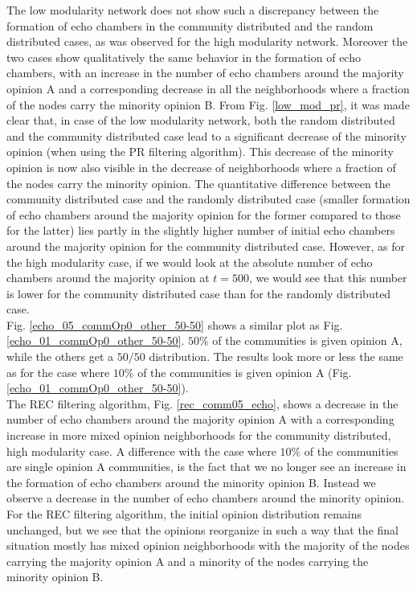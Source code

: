 \documentclass[11 pt , letterpaper , twoside , openright]{book}
\begin{document}
The low modularity network does not show such a discrepancy between the formation of echo chambers in the community distributed and the random distributed cases, as was observed for the high modularity network. Moreover the two cases show qualitatively the same behavior in the formation of echo chambers, with an increase in the number of echo chambers around the majority opinion A and a corresponding decrease in all the neighborhoods where a fraction of the nodes carry the minority opinion B. From Fig. \ref{low_mod_pr}, it was made clear that, in case of the low modularity network, both the random distributed and the community distributed case lead to a significant decrease of the minority opinion (when using the PR filtering algorithm). This decrease of the minority opinion is now also visible in the decrease of neighborhoods where a fraction of the nodes carry the minority opinion. The quantitative difference between the community distributed case and the randomly distributed case (smaller formation of echo chambers around the majority opinion for the former compared to those for the latter) lies partly in the slightly higher number of initial echo chambers around the majority opinion for the community distributed case. However, as for the high modularity case, if we would look at the absolute number of echo chambers around the majority opinion at $t=500$, we would see that this number is lower for the community distributed case than for the randomly distributed case. %
\\
\newline
Fig. \ref{echo_05_commOp0_other_50-50} shows a similar plot as Fig. \ref{echo_01_commOp0_other_50-50}. $50 \%$ of the communities is given opinion A, while the others get a $50/50$ distribution. The results look more or less the same as for the case where $10 \%$ of the communities is given opinion A (Fig. \ref{echo_01_commOp0_other_50-50}).\\
\newline
The REC filtering algorithm, Fig. \ref{rec_comm05_echo}, shows a decrease in the number of echo chambers around the majority opinion A with a corresponding increase in more mixed opinion neighborhoods for the community distributed, high modularity case. A difference with the case where $10 \%$ of the communities are single opinion A communities, is the fact that we no longer see an increase in the formation of echo chambers around the minority opinion B. Instead we observe a decrease in the number of echo chambers around the minority opinion. For the REC filtering algorithm, the initial opinion distribution remains unchanged, but we see that the opinions reorganize in such a way that the final situation mostly has mixed opinion neighborhoods with the majority of the nodes carrying the majority opinion A and a minority of the nodes carrying the minority opinion B. \\
\end{document}

